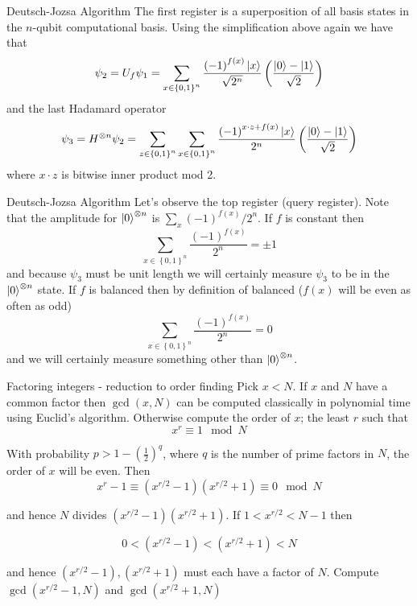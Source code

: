\documentclass{beamer}
\begin{document}
\begin{frame}{Deutsch-Jozsa Algorithm}
The first register is a superposition of all basis states in the $n$-qubit
computational basis. Using the simplification above again we have
that 
\[
\psi_{2}=U_{f}\psi_{1}=\sum_{x\in\left\{ 0,1\right\} ^{n}}\frac{\left(-1\right)^{f\left(x\right)}\Ket{x}}{\sqrt{2^{n}}}\left(\frac{\Ket{0}-\Ket{1}}{\sqrt{2}}\right)
\]
and the last Hadamard operator 
\[
\psi_{3}=H^{\otimes n}\psi_{2}=\sum_{z\in\left\{ 0,1\right\} ^{n}}\sum_{x\in\left\{ 0,1\right\} ^{n}}\frac{\left(-1\right)^{x\cdot z+f\left(x\right)}\Ket{x}}{2^{n}}\left(\frac{\Ket{0}-\Ket{1}}{\sqrt{2}}\right)
\]
where $x\cdot z$ is bitwise inner product mod 2.  
\end{frame}

\begin{frame}{Deutsch-Jozsa Algorithm}
Let's observe the
top register (query register). Note that the amplitude for $\Ket{0}^{\otimes n}$
is $\sum_{x}\left(-1\right)^{f\left(x\right)}/2^{n}$. If $f$ is
constant then
\[
\sum_{x\in\left\{ 0,1\right\} ^{n}}\frac{\left(-1\right)^{f\left(x\right)}}{2^{n}}=\pm1
\]
and because $\psi_{3}$ must be unit length we will certainly measure
$\psi_{3}$ to be in the $\Ket{0}^{\otimes n}$ state. If $f$ is
balanced then by definition of balanced ($f\left(x\right)$ will be
even as often as odd) 
\[
\sum_{x\in\left\{ 0,1\right\} ^{n}}\frac{\left(-1\right)^{f\left(x\right)}}{2^{n}}=0
\]
and we will certainly measure something other than $\Ket{0}^{\otimes n}$.
\end{frame}


\begin{frame}{Factoring integers - reduction to order finding}
Pick $x<N$. If $x$ and $N$ have a common factor then $\gcd(x,N)$ can be computed classically in polynomial time using Euclid's algorithm. Otherwise compute the order of $x$; the least $r$ such that
\[
x^r\equiv 1 \mod N
\]

With probability $p>1-\left(\frac{1}{2}\right)^q$, where $q$ is the number of prime factors in $N$, the order of $x$ will be even. Then
\[
x^r-1\equiv \left(x^{r/2}-1\right)\left(x^{r/2}+1\right)\equiv 0 \mod N
\]

and hence $N$ divides $\left(x^{r/2}-1\right)\left(x^{r/2}+1\right)$. If $1<x^{r/2}<N-1$ then 

\[
0<\left(x^{r/2}-1\right)<\left(x^{r/2}+1\right)<N
\]

and hence $\left(x^{r/2}-1\right),\left(x^{r/2}+1\right)$ must each have a factor of $N$. Compute $\gcd(x^{r/2}-1,N)$ and $\gcd(x^{r/2}+1,N)$ 

\end{frame}
\end{document}
